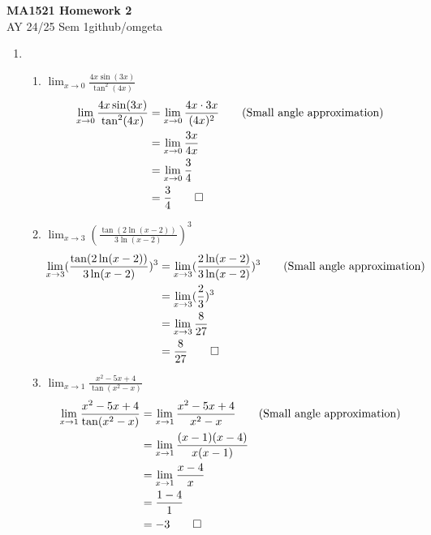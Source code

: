 \documentclass[12pt, a4paper]{article}
\newcommand{\mytitle}{MA1521 Homework 2}
\newcommand{\myauthor}{github/omgeta}
\newcommand{\mydate}{AY 24/25 Sem 1}
\begin{document}
\raggedright
\footnotesize
\begin{center}
{\normalsize{\textbf{\mytitle}}} \\
{\footnotesize{\mydate\hspace{2pt}\textemdash\hspace{2pt}\myauthor}}
\end{center}

\begin{enumerate}[Q\arabic*.]
  \item \begin{enumerate}[(\alph*)]
      \item $\displaystyle \lim_{x\to0}\frac{4x\sin(3x)}{\tan^2(4x)}$
        \begin{align*}
          \lim_{x\to0}\frac{4x\sin(3x)}{\tan^2(4x)} &= \lim_{x\to0}\frac{4x\cdot3x}{(4x)^2} \tag*{(Small angle approximation)} \\
                                                    &= \lim_{x\to0}\frac{3x}{4x} \\
                                                    &= \lim_{x\to0}\frac{3}{4} \\
                                                    &= \frac{3}{4} \qed
        \end{align*}

      \item $\displaystyle \lim_{x\to3}(\frac{\tan(2\ln(x-2))}{3\ln(x-2)})^3$
        \begin{align*}
          \lim_{x\to3}(\frac{\tan(2\ln(x-2))}{3\ln(x-2)})^3 &= \lim_{x\to3}(\frac{2\ln(x-2)}{3\ln(x-2)})^3 \tag*{(Small angle approximation)} \\
                                                            &= \lim_{x\to3}(\frac{2}{3})^3\\
                                                            &= \lim_{x\to3}\frac{8}{27}\\
                                                            &= \frac{8}{27} \qed
        \end{align*}
      \item $\displaystyle \lim_{x\to1}\frac{x^2-5x+4}{\tan(x^2-x)}$
        \begin{align*}
          \lim_{x\to1}\frac{x^2-5x+4}{\tan(x^2-x)} &= \lim_{x\to1}\frac{x^2-5x+4}{x^2-x} \tag*{(Small angle approximation)} \\
                                                   &= \lim_{x\to1}\frac{(x-1)(x-4)}{x(x-1)} \\
                                                   &= \lim_{x\to1}\frac{x-4}{x} \\
                                                   &= \frac{1-4}{1} \\
                                                   &= -3 \qed
        \end{align*}
  \end{enumerate}


\end{enumerate}
\end{document}
